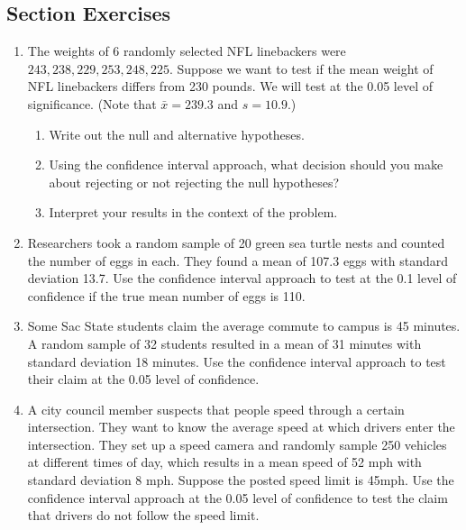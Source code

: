 \documentclass[
]{book}
\providecommand{\tightlist}{%
  \setlength{\itemsep}{0pt}\setlength{\parskip}{0pt}}
\begin{document}
\subsection*{Section Exercises}\label{section-exercises-22}

\begin{enumerate}
\def\labelenumi{\arabic{enumi}.}
\tightlist
\item
  The weights of 6 randomly selected NFL linebackers were \(243, 238, 229, 253, 248, 225\). Suppose we want to test if the mean weight of NFL linebackers differs from 230 pounds. We will test at the 0.05 level of significance. (Note that \(\bar{x} = 239.3\) and \(s = 10.9\).)

  \begin{enumerate}
  \def\labelenumii{\alph{enumii}.}
  \tightlist
  \item
    Write out the null and alternative hypotheses.
  \item
    Using the confidence interval approach, what decision should you make about rejecting or not rejecting the null hypotheses?
  \item
    Interpret your results in the context of the problem.
  \end{enumerate}
\item
  Researchers took a random sample of 20 green sea turtle nests and counted the number of eggs in each. They found a mean of 107.3 eggs with standard deviation 13.7. Use the confidence interval approach to test at the 0.1 level of confidence if the true mean number of eggs is 110.
\item
  Some Sac State students claim the average commute to campus is 45 minutes. A random sample of 32 students resulted in a mean of 31 minutes with standard deviation 18 minutes. Use the confidence interval approach to test their claim at the 0.05 level of confidence.
\item
  A city council member suspects that people speed through a certain intersection. They want to know the average speed at which drivers enter the intersection. They set up a speed camera and randomly sample 250 vehicles at different times of day, which results in a mean speed of 52 mph with standard deviation 8 mph. Suppose the posted speed limit is 45mph. Use the confidence interval approach at the 0.05 level of confidence to test the claim that drivers do not follow the speed limit.
\end{enumerate}
\end{document}
